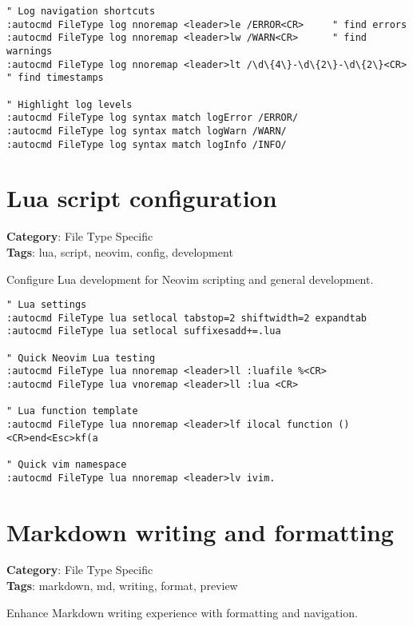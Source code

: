 {{{{{\begin{Exa*}{}
\begin{Verbatim}[fontsize=\footnotesize, breaklines, breakanywhere]
" Log navigation shortcuts
:autocmd FileType log nnoremap <leader>le /ERROR<CR>     " find errors
:autocmd FileType log nnoremap <leader>lw /WARN<CR>      " find warnings
:autocmd FileType log nnoremap <leader>lt /\d\{4\}-\d\{2\}-\d\{2\}<CR>  " find timestamps

" Highlight log levels
:autocmd FileType log syntax match logError /ERROR/
:autocmd FileType log syntax match logWarn /WARN/
:autocmd FileType log syntax match logInfo /INFO/
\end{Verbatim}
\end{Exa*}

\section{Lua script configuration}

\textbf{Category}: File Type Specific\\ \textbf{Tags}: lua, script, neovim, config, development
\vspace{0.5cm}

Configure Lua development for Neovim scripting and general development.

\begin{Exa*}{}
\begin{Verbatim}[fontsize=\footnotesize, breaklines, breakanywhere]
" Lua settings  
:autocmd FileType lua setlocal tabstop=2 shiftwidth=2 expandtab
:autocmd FileType lua setlocal suffixesadd+=.lua

" Quick Neovim Lua testing
:autocmd FileType lua nnoremap <leader>ll :luafile %<CR>
:autocmd FileType lua vnoremap <leader>ll :lua <CR>

" Lua function template
:autocmd FileType lua nnoremap <leader>lf ilocal function ()<CR>end<Esc>kf(a

" Quick vim namespace
:autocmd FileType lua nnoremap <leader>lv ivim.
\end{Verbatim}
\end{Exa*}

\section{Markdown writing and formatting}

\textbf{Category}: File Type Specific\\ \textbf{Tags}: markdown, md, writing, format, preview
\vspace{0.5cm}

Enhance Markdown writing experience with formatting and navigation.

}}}}}
